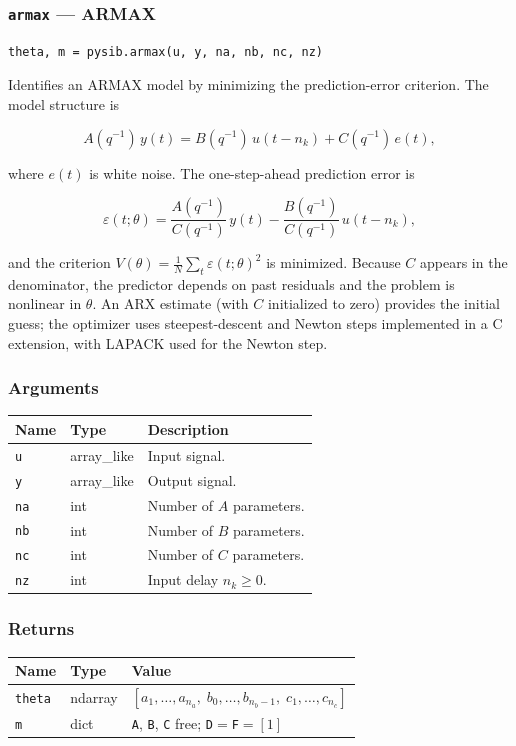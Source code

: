 \documentclass[../main]{subfiles}
\begin{document}
\newpage

\subsubsection{\texttt{armax} --- ARMAX}

\begin{lstlisting}
theta, m = pysib.armax(u, y, na, nb, nc, nz)
\end{lstlisting}

Identifies an ARMAX model by minimizing the prediction-error
criterion.  The model structure is

\[
  A(q^{-1})\,y(t) =
  B(q^{-1})\,u(t - n_k) + C(q^{-1})\,e(t),
\]

where $e(t)$ is white noise.
The one-step-ahead prediction error is

\[
  \varepsilon(t;\theta) =
  \frac{A(q^{-1})}{C(q^{-1})}\,y(t)
  - \frac{B(q^{-1})}{C(q^{-1})}\,u(t-n_k),
\]

and the criterion $V(\theta) = \tfrac{1}{N}\sum_t \varepsilon(t;\theta)^2$
is minimized.  Because $C$ appears in the denominator, the predictor
depends on past residuals and the problem is nonlinear in $\theta$.
An ARX estimate (with $C$ initialized to zero) provides the initial
guess; the optimizer uses steepest-descent and Newton steps
implemented in a C extension, with LAPACK used for the Newton step.

\subsubsection*{Arguments}
\begin{center}
\begin{tabular}{lll}
  \toprule
  Name & Type & Description \\
  \midrule
  \texttt{u}  & array\_like & Input signal. \\
  \texttt{y}  & array\_like & Output signal. \\
  \texttt{na} & int & Number of $A$ parameters. \\
  \texttt{nb} & int & Number of $B$ parameters. \\
  \texttt{nc} & int & Number of $C$ parameters. \\
  \texttt{nz} & int & Input delay $n_k \geq 0$. \\
  \bottomrule
\end{tabular}
\end{center}

\subsubsection*{Returns}
\begin{center}
\begin{tabular}{lll}
  \toprule
  Name & Type & Value \\
  \midrule
  \texttt{theta} & ndarray & $[a_1,\ldots,a_{n_a},\; b_0,\ldots,b_{n_b-1},\; c_1,\ldots,c_{n_c}]$ \\
  \texttt{m}     & dict    & \texttt{A}, \texttt{B}, \texttt{C} free; \texttt{D}$=$\texttt{F}$=[1]$ \\
  \bottomrule
\end{tabular}
\end{center}
\end{document}
